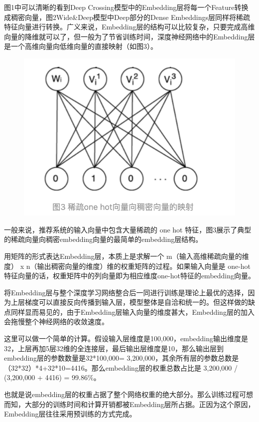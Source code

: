 \documentclass[12pt]{article}
\begin{document}
图1中可以清晰的看到Deep Crossing模型中的Embedding层将每一个Feature转换成稠密向量，图2Wide\&Deep模型中Deep部分的Dense Embeddings层同样将稀疏特征向量进行转换。广义来说，Embedding层的结构可以比较复杂，只要完成高维向量的降维就可以了，但一般为了节省训练时间，深度神经网络中的Embedding层是一个高维向量向低维向量的直接映射（如图3）。
\begin{figure}[H]
    \centering
    \includegraphics[width=.5\textwidth]{fig/Embedding_From_One_Hot_Example.png}
\end{figure}

一般来说，推荐系统的输入向量中包含大量稀疏的 one hot 特征，图3展示了典型的稀疏向量向稠密embedding向量的最简单的embedding层结构。

用矩阵的形式表达Embedding层，本质上是求解一个 m（输入高维稀疏向量的维度） x n（输出稠密向量的维度）维的权重矩阵的过程。如果输入向量是 one-hot 特征向量的话，权重矩阵中的列向量即为相应维度one-hot特征的embedding向量。

将Embedding层与整个深度学习网络整合后一同进行训练是理论上最优的选择，因为上层梯度可以直接反向传播到输入层，模型整体是自洽和统一的。但这样做的缺点同样显而易见的，由于Embedding层输入向量的维度甚大，Embedding层的加入会拖慢整个神经网络的收敛速度。

\begin{framed}
这里可以做一个简单的计算。假设输入层维度是100,000，embedding输出维度是32，上层再加5层32维的全连接层，最后输出层维度是10，那么输出层到embedding层的参数数量是32*100,000= 3,200,000，其余所有层的参数总数是 （32*32）*4+32*10=4416。那么embedding层的权重总数占比是 3,200,000 / (3,200,000 + 4416) = 99.86\%。
\end{framed}

也就是说embedding层的权重占据了整个网络权重的绝大部分。那么训练过程可想而知，大部分的训练时间和计算开销都被Embedding层所占据。正因为这个原因，Embedding层往往采用预训练的方式完成。
\end{document}
